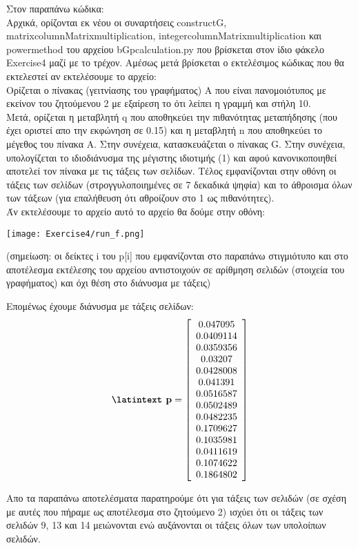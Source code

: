 \documentclass[a4paper,11pt]{article}
\newcommand{\lt}{\latintext}
\newcommand{\gt}{\greektext}
\begin{document}
\lt

\gt

Στον παραπάνω κώδικα:\\
Αρχικά, ορίζονται εκ νέου οι  συναρτήσεις {\lt construct\textunderscore G}, {\lt matrix\textunderscore columnMatrix\textunderscore multiplication}, {\lt integer\textunderscore columnMatrix\textunderscore multiplication} και {\lt power\textunderscore method} του αρχείου {\lt b\textunderscore G\textunderscore p\textunderscore calculation.py} που βρίσκεται στον ίδιο φάκελο {\lt Exercise4} μαζί με το τρέχον.
Αμέσως μετά βρίσκεται ο εκτελέσιμος κώδικας που θα εκτελεστεί αν εκτελέσουμε το αρχείο:\\
Ορίζεται ο πίνακας (γειτνίασης του γραφήματος) Α που είναι πανομοιότυπος με εκείνον του ζητούμενου 2 με εξαίρεση το ότι λείπει η γραμμή και στήλη 10.\\
Μετά, ορίζεται η μεταβλητή {\lt q} που αποθηκεύει την πιθανότητας μεταπήδησης (που έχει οριστεί απο την εκφώνηση σε 0.15) και η μεταβλητή {\lt n} που αποθηκεύει το μέγεθος του πίνακα Α. Στην συνέχεια, κατασκευάζεται ο πίνακας {\lt G}. Στην συνέχεια, υπολογίζεται το ιδιοδιάνυσμα της μέγιστης ιδιοτιμής (1) και αφού κανονικοποιηθεί αποτελεί τον πίνακα με τις τάξεις των σελίδων. Τέλος εμφανίζονται στην οθόνη οι τάξεις των σελίδων (στρογγυλοποιημένες σε 7 δεκαδικά ψηφία) και το άθροισμα όλων των τάξεων (για επαλήθευση ότι αθροίζουν στο 1 ως πιθανότητες).\\

Άν εκτελέσουμε το αρχείο αυτό το αρχείο θα δούμε στην οθόνη:\\
\begin{center}
    \texttt{[image: Exercise4/run\_f.png]}\\
\end{center}

(σημείωση: οι δείκτες {\lt i} του {\lt p[i]} που εμφανίζονται στο παραπάνω στιγμιότυπο και στο αποτέλεσμα εκτέλεσης του αρχείου αντιστοιχούν σε αρίθμηση σελιδών (στοιχεία του γραφήματος) και όχι θέση στο διάνυσμα με τάξεις)

Επομένως έχουμε διάνυσμα με τάξεις σελίδων:\\
\[\textbf{{\lt p}}=
    \left[ \begin{array}{c}
    0.047095 \\
    0.0409114 \\
    0.0359356 \\
    0.03207 \\
    0.0428008 \\
    0.041391 \\
    0.0516587 \\
    0.0502489 \\
    0.0482235 \\
    0.1709627 \\
    0.1035981 \\
    0.0411619 \\
    0.1074622 \\
    0.1864802 \\
    \end{array} \right]
\]

Απο τα παραπάνω αποτελέσματα παρατηρούμε ότι για τάξεις των σελιδών (σε σχέση με αυτές που πήραμε ως αποτέλεσμα στο ζητούμενο 2) ισχύει ότι οι τάξεις των σελιδών 9, 13 και 14 μειώνονται ενώ αυξάνονται οι τάξεις όλων των υπολοίπων σελιδών.
\end{document}
